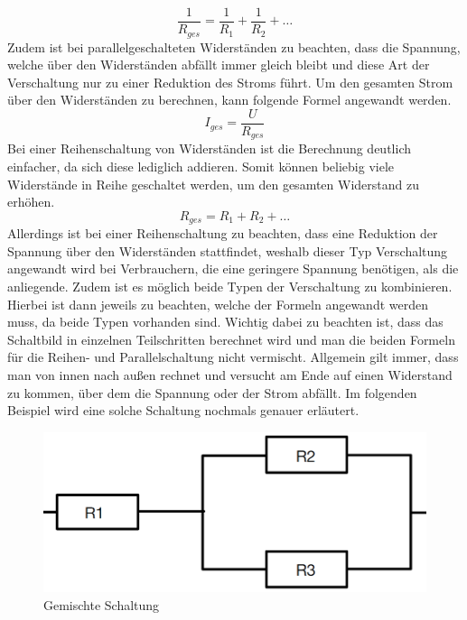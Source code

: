 \begin{equation}
\frac{1}{R_{ges}}=\frac{1}{R_1}+\frac{1}{R_2}+…
\label{eqn:Parallelschaltung von mehreren Widerständen}
\end{equation}
Zudem ist bei parallelgeschalteten Widerständen zu beachten, dass die Spannung, welche über den Widerständen abfällt immer gleich bleibt und diese Art der 
Verschaltung nur zu einer Reduktion des Stroms führt. Um den gesamten Strom über den Widerständen zu berechnen, kann folgende Formel angewandt werden.
\begin{equation}
I_{ges} = \frac{U}{R_{ges}}
\label{eqn:Gesamtstrom Parallelschaltung}
\end{equation}
Bei einer Reihenschaltung von Widerständen ist die Berechnung deutlich einfacher, da sich diese lediglich addieren. Somit können beliebig viele Widerstände 
in Reihe geschaltet werden, um den gesamten Widerstand zu erhöhen.
\begin{equation}
R_{ges}=R_1+R_2+…
\label{eqn:Widerstand Reihenschaltung}
\end{equation}
Allerdings ist bei einer Reihenschaltung zu beachten, dass eine Reduktion der Spannung über den Widerständen stattfindet, weshalb dieser Typ Verschaltung 
angewandt wird bei Verbrauchern, die eine geringere Spannung benötigen, als die anliegende. Zudem ist es möglich beide Typen der Verschaltung zu kombinieren. 
Hierbei ist dann jeweils zu beachten, welche der Formeln angewandt werden muss, da beide Typen vorhanden sind. Wichtig dabei zu beachten ist, dass das 
Schaltbild in einzelnen Teilschritten berechnet wird und man die beiden Formeln für die Reihen- und Parallelschaltung nicht vermischt. 
Allgemein gilt immer, dass man von innen nach außen rechnet und versucht am Ende auf einen Widerstand zu kommen, über dem die Spannung oder der Strom abfällt.
\clearpage
Im folgenden Beispiel wird eine solche Schaltung nochmals genauer erläutert.
\begin{figure}[hbt]
    \centering
    \includegraphics[width=0.8\linewidth]{images/Gemischte Schaltung}
    \caption[Gemischte Schaltung]{Gemischte Schaltung}
    \label{fig:Gemischte Schaltung}
\end{figure}
